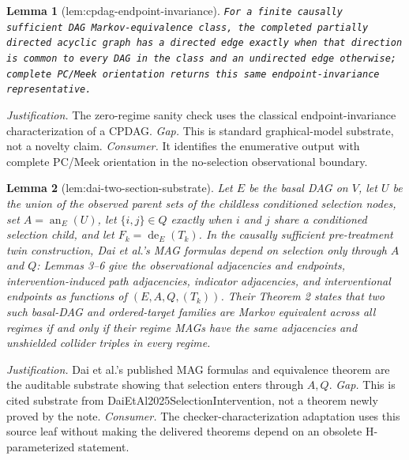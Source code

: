 \documentclass{article}
\newtheorem{lemma}{Lemma}
\begin{document}
\begin{lemma}[lem:cpdag-endpoint-invariance]\label{lem:cpdag-endpoint-invariance}
\texttt{For a finite causally sufficient DAG Markov-\allowbreak{}equivalence class,\allowbreak{} the completed partially directed acyclic graph has a directed edge exactly when that direction is common to every DAG in the class and an undirected edge otherwise;\allowbreak{} complete PC/\allowbreak{}Meek orientation returns this same endpoint-\allowbreak{}invariance representative.}
\end{lemma}
\par\smallskip\noindent \textit{Justification.} The zero-regime sanity check uses the classical endpoint-invariance characterization of a CPDAG. \textit{Gap.} This is standard graphical-model substrate, not a novelty claim. \textit{Consumer.} It identifies the enumerative output with complete PC/Meek orientation in the no-selection observational boundary.

\begin{lemma}[lem:dai-two-section-substrate]\label{lem:dai-two-section-substrate}
Let \(E\) be the basal DAG on \(V\), let \(U\) be the union of the observed parent sets of the childless conditioned selection nodes, set \(A=\operatorname{an}_E(U)\), let \(\{i,j\}\in Q\) exactly when \(i\) and \(j\) share a conditioned selection child, and let \(F_k=\operatorname{de}_E(T_k)\).  In the causally sufficient pre-treatment twin construction, Dai et al.'s MAG formulas depend on selection only through \(A\) and \(Q\): Lemmas 3--6 give the observational adjacencies and endpoints, intervention-induced path adjacencies, indicator adjacencies, and interventional endpoints as functions of \((E,A,Q,(T_k))\).  Their Theorem 2 states that two such basal-DAG and ordered-target families are Markov equivalent across all regimes if and only if their regime MAGs have the same adjacencies and unshielded collider triples in every regime.
\end{lemma}
\par\smallskip\noindent \textit{Justification.} Dai et al.'s published MAG formulas and equivalence theorem are the auditable substrate showing that selection enters through \(A,Q\). \textit{Gap.} This is cited substrate from DaiEtAl2025SelectionIntervention, not a theorem newly proved by the note. \textit{Consumer.} The checker-characterization adaptation uses this source leaf without making the delivered theorems depend on an obsolete H-parameterized statement.
\end{document}

